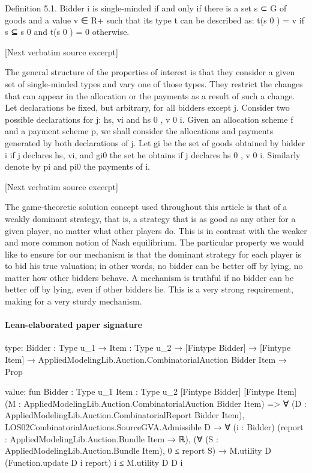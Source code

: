\documentclass[10pt]{article}
\begin{document}
\begin{ReviewVerbatim}

Definition 5.1. Bidder i is single-minded if and only if there is a set s ⊂ G of
goods and a value v ∈ R+ such that its type t can be described as: t(s 0 ) = v if s ⊆ s 0
and t(s 0 ) = 0 otherwise.

[Next verbatim source excerpt]

The general structure of the properties of interest is that they consider a given
set of single-minded types and vary one of those types. They restrict the changes
that can appear in the allocation or the payments as a result of such a change.
Let declarations be fixed, but arbitrary, for all bidders except j. Consider two
possible declarations for j: hs, vi and hs 0 , v 0 i. Given an allocation scheme f and a
payment scheme p, we shall consider the allocations and payments generated by
both declarations of j. Let gi be the set of goods obtained by bidder i if j declares
hs, vi, and gi0 the set he obtains if j declares hs 0 , v 0 i. Similarly denote by pi and pi0
the payments of i.

[Next verbatim source excerpt]

The game-theoretic solution concept used throughout this article is that of a weakly
dominant strategy, that is, a strategy that is as good as any other for a given player,
no matter what other players do. This is in contrast with the weaker and more
common notion of Nash equilibrium. The particular property we would like to
ensure for our mechanism is that the dominant strategy for each player is to bid
his true valuation; in other words, no bidder can be better off by lying, no matter
how other bidders behave. A mechanism is truthful if no bidder can be better off by
lying, even if other bidders lie. This is a very strong requirement, making for a very
sturdy mechanism.
\end{ReviewVerbatim}



\paragraph{Lean-elaborated paper signature}
\begin{ReviewVerbatim}
type:
{Bidder : Type u_1} →
  {Item : Type u_2} →
    [Fintype Bidder] → [Fintype Item] → AppliedModelingLib.Auction.CombinatorialAuction Bidder Item → Prop

value:
fun {Bidder : Type u_1} {Item : Type u_2} [Fintype Bidder] [Fintype Item]
    (M : AppliedModelingLib.Auction.CombinatorialAuction Bidder Item) =>
  ∀ (D : AppliedModelingLib.Auction.CombinatorialReport Bidder Item),
    LOS02CombinatorialAuctions.SourceGVA.Admissible D →
      ∀ (i : Bidder) (report : AppliedModelingLib.Auction.Bundle Item → ℝ),
        (∀ (S : AppliedModelingLib.Auction.Bundle Item), 0 ≤ report S) →
          M.utility D (Function.update D i report) i ≤ M.utility D D i
\end{ReviewVerbatim}
\end{document}
